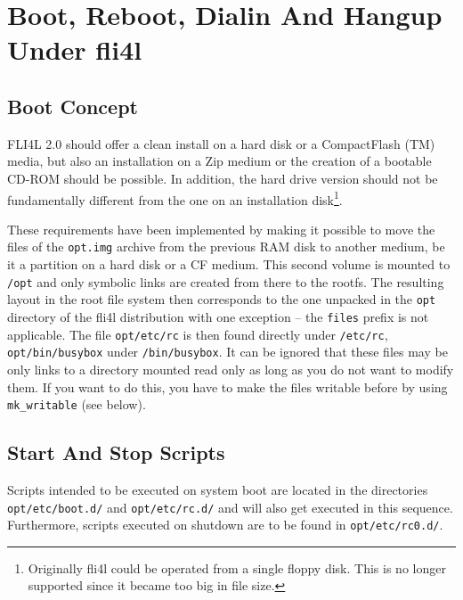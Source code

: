 
\section{Boot, Reboot, Dialin And Hangup Under fli4l}

\subsection{Boot Concept}

FLI4L 2.0 should offer a clean install on a hard disk or a
CompactFlash (TM) media, but also an installation on a
Zip medium or the creation of a bootable CD-ROM should be
possible. In addition, the hard drive version should not be
fundamentally different from the one on an installation disk\footnote{
Originally fli4l could be operated from a single floppy disk.
This is no longer supported since it became too big in file size.}.

These requirements have been implemented by making it possible to move
the files of the \texttt{opt.img} archive from the previous RAM disk to
another medium, be it a partition on a hard disk or a CF medium. This second
volume is mounted to \texttt{/opt} and only symbolic links are created from there
to the rootfs. The resulting layout in the root file system then corresponds
to the one unpacked in the  \texttt{opt} directory of the fli4l distribution with
one exception -- the \texttt{files} prefix is not applicable. The file 
\texttt{opt/etc/rc} is then found directly under \texttt{/etc/rc},
\texttt{opt/bin/busybox} under \texttt{/bin/busybox}. It can be
ignored that these files may be only links to a directory mounted read only
as long as you do not want to modify them. If you want to do this,
you have to make the files writable before by using \texttt{mk\_writable} (see below).

\subsection{Start And Stop Scripts}

Scripts intended to be executed on system boot are located in the
directories \texttt{opt/etc/boot.d/} and \texttt{opt/etc/rc.d/} and will also
get executed in this sequence. Furthermore, scripts executed on shutdown
are to be found in \texttt{opt/etc/rc0.d/}.


